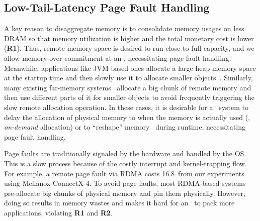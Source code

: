 \subsection{Low-Tail-Latency Page Fault Handling}

A key reason to disaggregate memory is to consolidate memory usages on less DRAM so that memory utilization is higher and the total monetary cost is lower (\textbf{R1}). Thus, remote memory space is desired to run close to full capacity, and we allow memory over-commitment at an \MN, necessitating page fault handling. Meanwhile, applications like JVM-based ones allocate a large heap memory space at the startup time and then slowly use it to allocate smaller objects~\cite{ali-trace}. Similarly, many existing far-memory systems~\cite{Tsai20-ATC,AIFM,FaRM} allocate a big chunk of remote memory and then use different parts of it for smaller objects to avoid frequently triggering the slow remote allocation operation.
In these cases, it is desirable for a \md\ system to delay the allocation of physical memory to when the memory is actually used (\ie, {\em on-demand} allocation) or to ``reshape'' memory~\cite{cliquemap-sigcomm21} during runtime, necessitating page fault handling.

Page faults are traditionally signaled by the hardware and handled by the OS. %
This is a slow process because of the costly interrupt and kernel-trapping flow.
For example, a remote page fault via RDMA costs 16.8\ms\ from our experiments using Mellanox ConnectX-4.
To avoid page faults, most RDMA-based systems pre-allocate big chunks of physical memory and pin them physically.
However, doing so results in memory wastes and makes it hard for an \MN\ to pack more applications, violating \textbf{R1} and \textbf{R2}.

